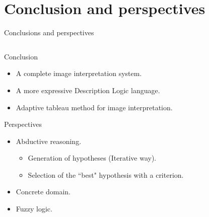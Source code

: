 \documentclass{beamer}
\begin{document}
\section{Conclusion and perspectives}
\begin{frame}{Conclusions and perspectives}
% 
\begin{columns}
 \begin{column}{.7\textwidth}
  
\begin{block}{Conclusion}
 \begin{itemize}
  \item A complete image interpretation system.
  \item A more expressive Description Logic language.
  \item Adaptive tableau method for image interpretation.
 \end{itemize}
\end{block}

\begin{block}{Perspectives}
\begin{itemize}
 \item Abductive reasoning.
 \begin{itemize}
  \item Generation of hypotheses (Iterative way).
  \item Selection of the ``best" hypothesis with a criterion.
 \end{itemize}
 \item Concrete domain.
 \item Fuzzy logic.
\end{itemize}
\end{block}
 \end{column}


\end{columns}
\end{frame}
\end{document}
